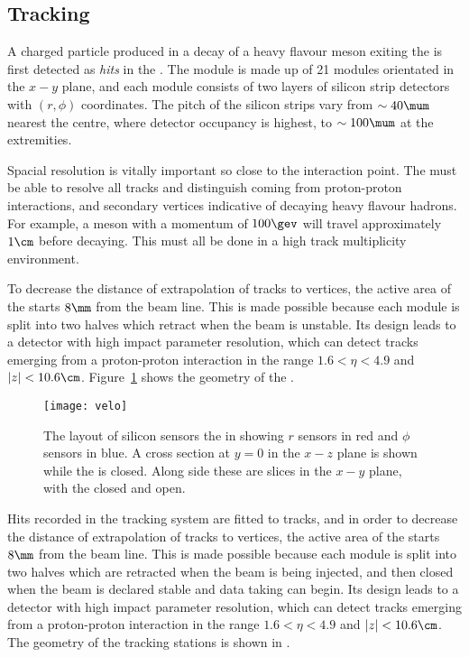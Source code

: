 \subsection{Tracking}

A charged particle produced in a decay of a heavy flavour meson exiting the \pv is first detected
as \emph{hits} in the \velo.
The \velo module is made up of 21 modules orientated in the $x-y$ plane, and
each module consists of two layers of silicon strip detectors with $(r,\phi)$ coordinates.
The pitch of the silicon strips vary from $\sim40\mum$ nearest the centre, where detector occupancy
is highest, to $\sim100\mum$ at the extremities.

Spacial resolution is vitally important so close to the interaction point.
The \velo must be able to resolve all tracks and distinguish  coming from
proton-proton interactions, and secondary vertices indicative of decaying heavy flavour hadrons.
For example, a \Bp meson with a momentum of $100\gev$ will travel approximately $1\cm$ before decaying.
This must all be done in a high track multiplicity environment.


To decrease the distance of extrapolation of tracks to vertices,
the active area of the \velo starts $8\mm$ from the beam line.
This is made possible because each module is split into two halves which retract when the \lhc beam
is unstable.
Its design leads to a detector with high impact parameter resolution, which can detect tracks
emerging from a proton-proton interaction in the range $1.6<\eta<4.9$ and $|z|<10.6\cm$.
Figure~\ref{fig:lhcb:velo} shows the geometry of the \velo.

\begin{figure}
  \begin{center}
    \texttt{[image: velo]}
  \end{center}
  \caption[LHCb Vertex Locator]
  {\small
    The layout of silicon sensors the \velo in showing $r$ sensors in red and $\phi$ sensors in
    blue.
    A cross section at $y=0$ in the $x-z$ plane is shown while the \velo is closed.
    Along side these are slices in the $x-y$ plane, with the \velo closed and open.
  }
  \label{fig:lhcb:velo}
\end{figure}

Hits recorded in the tracking system are fitted to tracks, and in order to decrease the
distance of extrapolation of tracks to vertices,
the active area of the \velo starts $8\mm$ from the beam line.
This is made possible because each module is split into two halves which are retracted when the
\lhc beam is being injected, and then closed when the beam is declared stable and data taking can
begin.
Its design leads to a detector with high impact parameter resolution, which can detect tracks
emerging from a proton-proton interaction in the range $1.6<\eta<4.9$ and $|z|<10.6\cm$.
The geometry of the tracking stations is shown in .

